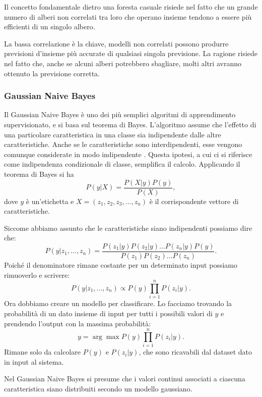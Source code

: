 \documentclass[12pt,italian]{report}
\begin{document}
Il concetto fondamentale dietro una foresta casuale risiede nel fatto che un grande numero di alberi non correlati tra loro che operano insieme tendono a essere più efficienti di un singolo albero.

La bassa correlazione è la chiave, modelli non correlati possono produrre previsioni d'insieme più accurate di qualsiasi singola previsione. La ragione risiede nel fatto che, anche se alcuni alberi potrebbero sbagliare, molti altri avranno ottenuto la previsione corretta.
\subsubsection{Gaussian Naive Bayes}
Il Gaussian Naive Bayes è uno dei più semplici algoritmi di apprendimento supervisionato, e si basa sul teorema di Bayes. L'algoritmo assume che l'effetto di una particolare caratteristica in una classe sia indipendente dalle altre caratteristiche. Anche se le caratteristiche sono interdipendenti, esse vengono comunque considerate in modo indipendente \cite{Mitchell97}. Questa ipotesi, a cui ci si riferisce come indipendenza condizionale di classe, semplifica il calcolo.
Applicando il teorema di Bayes si ha
\begin{equation}
P(y | X) = \frac{P(X | y) P(y)}{P(X)},
\end{equation}
dove $y$ è un'etichetta e $X = (z_1, z_2, z_3,...,z_n)$ è il corrispondente vettore di caratteristiche.

Siccome abbiamo assunto che le caratteristiche siano indipendenti possiamo dire che:
\begin{equation}
P(y| z_1,..., z_n) = \frac{P(z_1|y) P(z_2|y)...P(z_n|y)P(y)}{P(z_1)P(z_2)...P(z_n)}.
\end{equation}
Poiché il denominatore rimane costante per un determinato input possiamo rimuoverlo e scrivere:
\begin{equation}
P(y| z_1,..., z_n) \propto P(y) \prod_{i=1}^{n} P(z_i|y).
\end{equation}
Ora dobbiamo creare un modello per classificare. Lo facciamo trovando la probabilità di un dato insieme di input per tutti i possibili valori di $y$ e prendendo l'output con la massima probabilità:
\begin{equation}
y = \arg\max P(y) \prod_{i=1}^{n} P(z_i|y).
\end{equation}
Rimane solo da calcolare $P(y)$ e $P(z_i|y)$, che sono ricavabili dal dataset dato in input al sistema.

Nel Gaussian Naive Bayes si presume che i valori continui associati a ciascuna caratteristica siano distribuiti secondo un modello gaussiano. 
\end{document}
